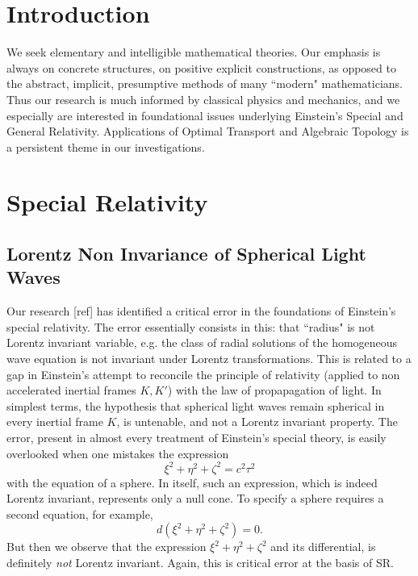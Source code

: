 \documentclass[12pt]{amsart}
\theoremstyle{remark}
\begin{document}
\title{}


\author{J. H. Martel}
\date{\today}
\maketitle

\begin{abstract}

\end{abstract}

\tableofcontents

\section{Introduction}
We seek elementary and intelligible mathematical theories. Our emphasis is always on concrete structures, on positive explicit constructions, as opposed to the abstract, implicit, presumptive methods of many ``modern" mathematicians. Thus our research is much informed by classical physics and mechanics, and we especially are interested in foundational issues underlying Einstein's Special and General Relativity. Applications of Optimal Transport and Algebraic Topology is a persistent theme in our investigations.

\section{Special Relativity}
\subsection{Lorentz Non Invariance of Spherical Light Waves}
Our research [ref] has identified a critical error in the foundations of Einstein's special relativity. The error essentially consists in this: that ``radius" is not Lorentz invariant variable, e.g. the class of radial solutions of the homogeneous wave equation is not invariant under Lorentz transformations. This is related to a gap in Einstein's attempt to reconcile the principle of relativity (applied to non accelerated inertial frames $K, K'$) with the law of propapagation of light. In simplest terms, the hypothesis that spherical light waves remain spherical in every inertial frame $K$, is untenable, and not a Lorentz invariant property. The error, present in almost every treatment of Einstein's special theory, is easily overlooked when one mistakes the expression $$\xi^2+\eta^2+\zeta^2=c^2 \tau^2$$ with the equation of a sphere. In itself, such an expression, which is indeed Lorentz invariant, represents only a null cone. To specify a sphere requires a second equation, for example, $$d(\xi^2+\eta^2+\zeta^2)=0.$$ But then we observe that the expression $\xi^2+\eta^2+\zeta^2$ and its differential, is definitely \emph{not} Lorentz invariant. Again, this is critical error at the basis of SR.
\end{document}

